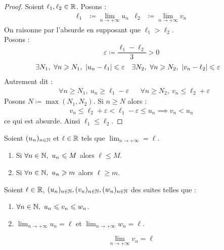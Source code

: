 \begin{proof}
    Soient $\ell_1, \ell_2 \in \mathbb{R}$.
    Posons :
    \begin{align*}
        \ell_1 &\coloneqq \lim_{n \to +\infty} u_n & \ell_2 &\coloneqq \lim_{n \to +\infty} v_n
    \end{align*}
    On raisonne par l'absurde en supposant que $\ell_1 > \ell_2$.
    \\
    Posons : 
    \[ \varepsilon \coloneqq \frac{\ell_1 - \ell_2}{3} > 0 \]
    \begin{align*}
        &\exists N_1,\ \forall n \geqslant N_1,\ \abs{u_n - \ell_1} \leqslant \varepsilon & 
        &\exists N_2,\ \forall n \geqslant N_2,\ \abs{v_n - \ell_2} \leqslant \varepsilon
    \end{align*}
    Autrement dit :
    \begin{align*}
        &\forall n \geq N_1,\ u_n \geq \ell_1 - \varepsilon &
        &\forall n \geq N_2,\ v_n \leq \ell_2 + \varepsilon
    \end{align*}
    Posons $N \coloneqq \max(N_1, N_2)$. Si $n \geq N$ alors :
    \begin{align*}
        v_n \leq \ell_2 + \varepsilon < \ell_1 - \varepsilon \leq u_n \implies v_n < u_n
    \end{align*}
    ce qui est absurde. Ainsi $\ell_1 \leq \ell_2$.
\end{proof}

\begin{corollary}
    Soient $(u_n)_{n \in \mathbb{N}}$ et $\ell \in \mathbb{R}$ tels que $\lim_{n \to +\infty} = \ell$.
    \begin{multicols}{2}
        \begin{enumerate}
            \item Si $\forall n \in \mathbb{N},\ u_n \leqslant M$ alors $\ell \leq M$.
            \item Si $\forall n \in \mathbb{N},\ u_n \geqslant m$ alors $\ell \geq m$.
        \end{enumerate}
    \end{multicols}
\end{corollary}

\begin{theorem}
    Soient $\ell \in \mathbb{R}$, $(u_n)_{n \in \mathbb{N}}, (v_n)_{n \in \mathbb{N}}, (w_n)_{n \in \mathbb{N}}$ des suites telles que :
    \begin{multicols}{2}
        \begin{enumerate}
            \item $\forall n \in \mathbb{N},\ u_n \leqslant v_n \leqslant w_n$.
            \item $\lim_{n \to +\infty} u_n = \ell$ et $\lim_{n \to +\infty} w_n = \ell$.
        \end{enumerate}
    \end{multicols} 
    \[ \lim_{n \to + \infty} v_n = \ell \]
\end{theorem}

